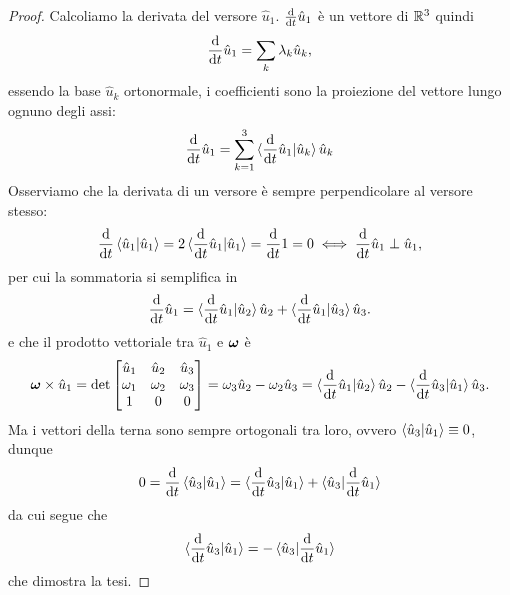     \begin{proof}
        Calcoliamo la derivata del versore $\hat{u}_1$.
        $\frac{\mathrm{d}}{\mathrm{d}t} \hat{u}_1$ è un vettore di $\mathbb{R}^3$ quindi 
        \begin{equation}
            \frac{\mathrm{d}}{\mathrm{d}t} \hat{u}_1 = \sum_k \lambda_k \hat{u}_k,
        \end{equation}
        essendo la base $\hat{u}_k$ ortonormale, i coefficienti sono la proiezione del vettore lungo ognuno degli assi:
        \begin{equation}
            \frac{\mathrm{d}}{\mathrm{d}t} \hat{u}_1 = \sum_{k=1}^3 \braket{\frac{\mathrm{d}}{\mathrm{d}t} \hat{u}_1|\hat{u}_k} \hat{u}_k
        \end{equation}
        Osserviamo che la derivata di un versore è sempre perpendicolare al versore stesso:
        \begin{equation}
            \frac{\mathrm{d}}{\mathrm{d}t} \braket{\hat{u}_1|\hat{u}_1} =2\braket{\frac{\mathrm{d}}{\mathrm{d}t} \hat{u}_1|\hat{u}_1}= \frac{\mathrm{d}}{\mathrm{d}t} 1 = 0 \iff \frac{\mathrm{d}}{\mathrm{d}t} \hat{u}_1 \perp \hat{u}_1,
        \end{equation}
        per cui la sommatoria si semplifica in 
        \begin{equation}
            \frac{\mathrm{d}}{\mathrm{d}t} \hat{u}_1 = \braket{\frac{\mathrm{d}}{\mathrm{d}t} \hat{u}_1| \hat{u}_2}\hat{u}_2 + \braket{\frac{\mathrm{d}}{\mathrm{d}t} \hat{u}_1| \hat{u}_3}\hat{u}_3.
        \end{equation}
        e che il prodotto vettoriale tra $\hat{u}_1$ e $\boldsymbol{\omega}$ è
        \begin{equation}
            \boldsymbol{\omega} \times \hat{u}_1 = \det 
            \begin{bmatrix}
                \hat{u}_1 &\hat{u}_2 & \hat{u}_3\\
                \omega_1 & \omega_2 & \omega_3 \\
                1 & 0 &0
            \end{bmatrix} = \omega_3 \hat{u}_2-\omega_2\hat{u}_3 = \braket{\frac{\mathrm{d}}{\mathrm{d}t} \hat{u}_1| \hat{u}_2}\hat{u}_2-\braket{\frac{\mathrm{d}}{\mathrm{d}t} \hat{u}_3|\hat{u}_1}\hat{u}_3.
        \end{equation}
        Ma i vettori della terna sono sempre ortogonali tra loro, ovvero $\braket{\hat{u}_3|\hat{u}_1}\equiv 0$, dunque
        \begin{equation}
            0= \frac{\mathrm{d}}{\mathrm{d}t} \braket{\hat{u}_3|\hat{u}_1} = \braket{\frac{\mathrm{d}}{\mathrm{d}t} \hat{u}_3| \hat{u}_1}+ \braket{\hat{u}_3|\frac{\mathrm{d}}{\mathrm{d}t} \hat{u}_1}
        \end{equation}
        da cui segue che
        \begin{equation}
            \braket{\frac{\mathrm{d}}{\mathrm{d}t} \hat{u}_3| \hat{u}_1} = -\braket{\hat{u}_3|\frac{\mathrm{d}}{\mathrm{d}t} \hat{u}_1}
        \end{equation}
        che dimostra la tesi.
    \end{proof}
